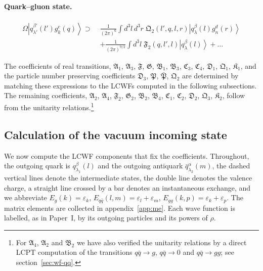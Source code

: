 \documentclass[11pt,a4paper]{article}
\numberwithin{equation}{section}
\newcommand{\mf}[1]{\mathfrak{#1}}
\newcommand{\eps}{\varepsilon}
\newcommand{\ket}[1]{\left|#1\right\rangle}
\newcommand{\OM}{\Omega}
\newcommand{\qk}[3]{q^{#1}_{#2}(#3)}
\newcommand{\aqk}[3]{\bar q^{#1}_{#2}(#3)}
\newcommand{\gl}[3]{g^{#1}_{#2}(#3)}
\begin{document}
\paragraph{Quark--gluon state.}
\begin{align}
\OM\ket{\qk{\beta'}{\lambda'}{l'}\gl{c}{k}{q}}\supset\;&\frac{1}{(2\pi)^{6}}\int\!d^{3}l\,d^{3}r\;
\mf Q_{2}(l',q,l,r)\ket{\qk{\beta}{\lambda}{l}\gl{d}{n}{r}}
\nonumber\\
&+\frac{1}{(2\pi)^{9/2}}\int\!d^{3}l\;\mf F_{2}(q,l',l)\ket{\qk{\beta}{\lambda}{l}}+\dots
\label{eq:Omqg}
\end{align}

The coefficients of real transitions, $\mf A_{1}$, $\mf A_{3}$, $\mf F$, $\mf G$, $\mf B_{1}$,
$\mf B_{3}$, $\mf C_{3}$, $\mf C_{4}$, $\mf D_{1}$, $\mf Q_{1}$, $\mf K_{1}$, and the particle number
preserving coefficients $\mf D_{3}$, $\mf P$, $\bar{\mf P}$, $\mf Q_{2}$ are determined by matching
these expressions to the LCWFs computed in the following subsections. The remaining coefficients,
$\mf A_{2}$, $\mf A_{4}$, $\mf F_{2}$, $\mf G_{2}$, $\mf B_{2}$, $\mf B_{4}$, $\mf C_{1}$, $\mf C_{2}$,
$\mf D_{2}$, $\mf Q_{3}$, $\mf K_{2}$, follow from the unitarity relations.\footnote{For
$\mf A_{4}$, $\mf A_{2}$ and $\mf B_{2}$ we have also verified the unitarity relations by a direct
LCPT computation of the transitions $q\bar q\to g$, $q\bar q\to0$ and $q\bar q\to gg$; see
section~\ref{sec:wf-qq}.}

\subsection{Calculation of the vacuum incoming state}
\label{sec:wf-vac}

We now compute the LCWF components that fix the coefficients. Throughout, the outgoing quark is
$\qk{\beta}{\lambda_{1}}{l}$ and the outgoing antiquark $\aqk{\alpha}{\lambda_{2}}{m}$, the dashed
vertical lines denote the intermediate states, the double line denotes the valence charge, a
straight line crossed by a bar denotes an instantaneous exchange, and we abbreviate
$E_{g}(k)=\eps_{k}$, $E_{q\bar q}(l,m)=\eps_{l}+\eps_{m}$, $E_{gg}(k,p)=\eps_{k}+\eps_{p}$. The
matrix elements are collected in appendix~\ref{app:me}. Each wave function is labelled, as in
Paper~I, by its outgoing particles and its powers of $\rho$.
\end{document}
